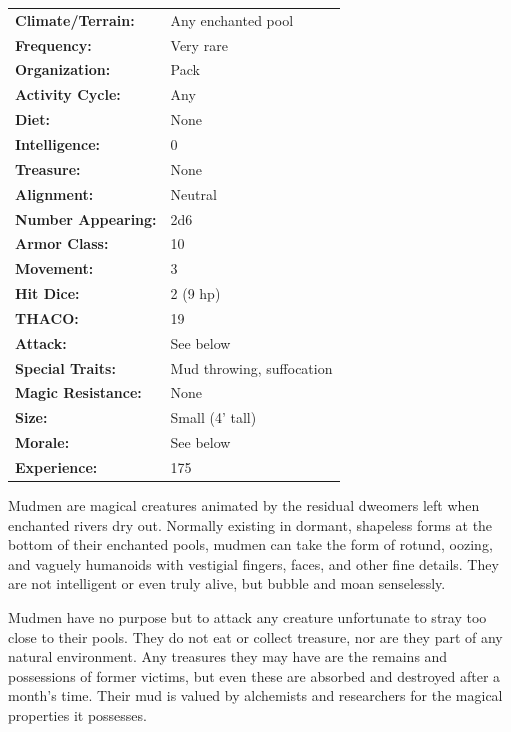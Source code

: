 \begin{multicols}{2}
\begin{minipage}{\columnwidth}
\noindent
\begin{tabular}{p{}p{}}
\textbf{Climate/Terrain:}	& Any enchanted pool \\
\textbf{Frequency:} 		& Very rare \\
\textbf{Organization:} 		& Pack \\
\textbf{Activity Cycle:} 	& Any \\
\textbf{Diet:} 				& None \\
\textbf{Intelligence:} 		& 0 \\
\textbf{Treasure:} 			& None \\
\textbf{Alignment:} 		& Neutral \\
\hline
\textbf{Number Appearing:} 	& 2d6 \\
\textbf{Armor Class:} 		& 10 \\
\textbf{Movement:} 			& 3 \\
\textbf{Hit Dice:} 			& 2 (9 hp) \\
\textbf{THACO:} 			& 19 \\
\textbf{Attack:} 			& See below \\
\textbf{Special Traits:} & Mud throwing, suffocation \\
\textbf{Magic Resistance:} 	& None \\
\textbf{Size:} 				& Small (4' tall) \\
\textbf{Morale:} 			& See below \\
\textbf{Experience:} 		& 175 \\
\end{tabular}

\end{minipage}

Mudmen are magical creatures animated by the residual dweomers left when enchanted rivers dry out. Normally existing in dormant, shapeless forms at the bottom of their enchanted pools, mudmen can take the form of rotund, oozing, and vaguely humanoids with vestigial fingers, faces, and other fine details. They are not intelligent or even truly alive, but bubble and moan senselessly.

Mudmen have no purpose but to attack any creature unfortunate to stray too close to their pools. They do not eat or collect treasure, nor are they part of any natural environment. Any treasures they may have are the remains and possessions of former victims, but even these are absorbed and destroyed after a month's time. Their mud is valued by alchemists and researchers for the magical properties it possesses.


\end{multicols}
